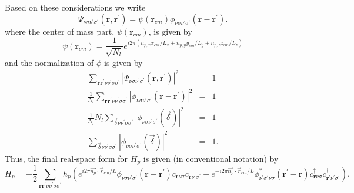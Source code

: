 Based on these considerations we write
\begin{equation}
\Psi_{\nu\sigma\nu^{\prime}\sigma^{\prime}}(\mathbf{r},\mathbf{r}^{\prime}) = 
\psi\left(\mathbf{r}_{cm}\right) 
\phi_{\nu\sigma\nu^{\prime}\sigma^{\prime}}(\mathbf{r} - \mathbf{r}^{\prime}).
\end{equation}
where the center of mass part, $\psi(\mathbf{r}_{cm})$, is given
by
\begin{equation}
\psi(\mathbf{r}_{cm}) = 
\frac{1}{\sqrt{N_l}}e^{i 2 \pi ( n_{p,x} x_{cm} / L_x + n_{p,y} y_{cm}/L_y + 
n_{p,z} z_{cm}/L_z)}
\end{equation}
and the normalization of $\phi$ is given by
\begin{eqnarray}
\sum_{\mathbf{r}\mathbf{r}^{\prime}\nu\nu^{\prime}\sigma\sigma^{\prime}} 
|\Psi_{\nu\sigma\nu^{\prime}\sigma^{\prime}}(\mathbf{r},\mathbf{r}^{\prime})|^2 
& = & 1 \\
\frac{1}{N_l}
\sum_{\mathbf{r}\mathbf{r}^{\prime}\nu\nu^{\prime}\sigma\sigma^{\prime}} 
|\phi_{\nu\sigma\nu^{\prime}\sigma^{\prime}}(\mathbf{r} - \mathbf{r}^{\prime}) |^2 
& = & 1\\
\frac{1}{N_l} N_l \sum_{\vec{\delta}\nu\nu^{\prime}\sigma\sigma^{\prime}} 
|\phi_{\nu\sigma\nu^{\prime}\sigma^{\prime}}(\vec{\delta})|^2 & = & 
1 \\
\sum_{\vec{\delta}\nu\nu^{\prime}\sigma\sigma^{\prime}} 
|\phi_{\nu\sigma\nu^{\prime}\sigma^{\prime}}(\vec{\delta}) |^2 & = & 1.
\end{eqnarray}
Thus, the final real-space form for $H_p$ is given (in conventional
notation) by
\begin{equation}
\label{H_p_real}
H_p = -\frac{1}{2}
\sum_{\mathbf{r}\mathbf{r}^{\prime}\nu\nu^{\prime}\sigma\sigma^{\prime}} 
 h_p \left(e^{i 2 \pi \vec{n_p}\cdot \vec{r}_{cm}/L} 
\phi_{\nu\sigma\nu^{\prime}\sigma^{\prime}}(\mathbf{r} -
\mathbf{r}^{\prime}) c_{\mathbf{r}\nu\sigma} c_{\mathbf{r}\nu^{\prime}\sigma^{\prime}}
+e^{-i 2 \pi \vec{n_p}\cdot \vec{r}_{cm}/L} 
\phi_{\nu^{\prime}\sigma^{\prime}\nu\sigma}^*(\mathbf{r}^{\prime} -
\mathbf{r})c^{\dagger}_{\mathbf{r}\nu\sigma}
c^{\dagger}_{\mathbf{r}^{\prime}\nu^{\prime}\sigma^{\prime}} \right).
\end{equation}

